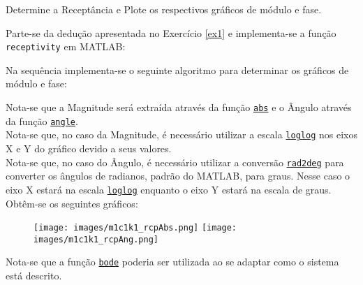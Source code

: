 \documentclass{article}
\begin{document}
\newpage
\begin{exercise}\label{ex2}
    Determine a Receptância e Plote os respectivos gráficos de módulo e fase.
\end{exercise}
\begin{resolution}
    Parte-se da dedução apresentada no Exercício \ref{ex1} e implementa-se a função \texttt{receptivity} em MATLAB:
    \begin{scriptsize}
        \myMatlab
    \end{scriptsize}
    Na sequência implementa-se o seguinte algoritmo para determinar os gráficos de módulo e fase:
    \begin{scriptsize}
        \myMatlab
    \end{scriptsize}
    Nota-se que a Magnitude será extraída através da função \href{https://www.mathworks.com/help/matlab/ref/abs.html}{\texttt{abs}} e o Ângulo através da função \href{https://www.mathworks.com/help/matlab/ref/angle.html}{\texttt{angle}}.\\

    Nota-se que, no caso da Magnitude, é necessário utilizar a escala \href{https://www.mathworks.com/help/matlab/ref/loglog.html}{\texttt{loglog}} nos eixos X e Y do gráfico devido a seus valores.\\

    Nota-se que, no caso do Ângulo, é necessário utilizar a conversão \href{https://www.mathworks.com/help/matlab/ref/rad2deg.html}{\texttt{rad2deg}} para converter os ângulos de radianos, padrão do MATLAB, para graus. Nesse caso o eixo X estará na escala \href{https://www.mathworks.com/help/matlab/ref/loglog.html}{\texttt{loglog}} enquanto o eixo Y estará na escala de graus.\\

    \noindent Obtêm-se os seguintes gráficos:
    \begin{figure}[H]
        \centering
        \texttt{[image: images/m1c1k1\_rcpAbs.png]}
        \texttt{[image: images/m1c1k1\_rcpAng.png]}
    \end{figure}
    Nota-se que a função \href{https://www.mathworks.com/help/control/ref/lti.bode.html}{\texttt{bode}} poderia ser utilizada ao se adaptar como o sistema está descrito.
\end{resolution}
\end{document}
